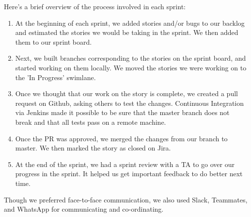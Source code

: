 \documentclass[12pt]{article}
\begin{document}
\par Here's a brief overview of the process involved in each sprint:
\begin{enumerate}
  \item At the beginning of each sprint, we added stories and/or bugs to our backlog and estimated the stories we would be taking in the sprint. We then added them to our sprint board. 
  \item Next, we built branches corresponding to the stories on the sprint board, and started working on them locally. We moved the stories we were working on to the 'In Progress' swimlane.
  \item Once we thought that our work on the story is complete, we created a pull request on Github, asking others to test the changes. Continuous Integration via Jenkins made it possible to be sure that the master branch does not break and that all tests pass on a remote machine. 
  \item Once the PR was approved, we merged the changes from our branch to master. We then marked the story as closed on Jira. 
  \item At the end of the sprint, we had a sprint review with a TA to go over our progress in the sprint. It helped us get important feedback to do better next time.  
\end{enumerate}
\par Though we preferred face-to-face communication, we also used Slack, Teammates, and WhatsApp for communicating and co-ordinating. 

\pagebreak
\end{document}
